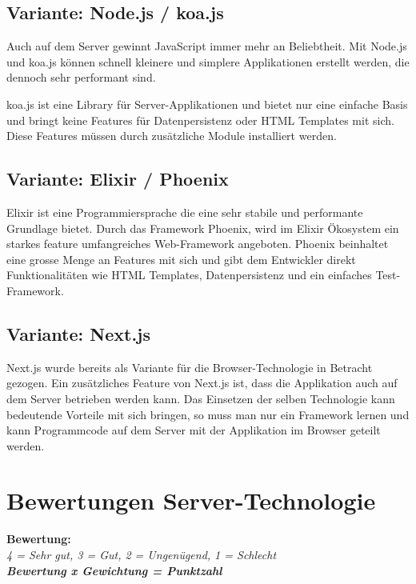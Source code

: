 \subsection{Variante: Node.js / koa.js}

Auch auf dem Server gewinnt JavaScript immer mehr an Beliebtheit.
Mit Node.js und koa.js können schnell kleinere und simplere Applikationen
erstellt werden, die dennoch sehr performant sind.

koa.js ist eine Library für Server-Applikationen und bietet nur eine einfache
Basis und bringt keine Features für Datenpersistenz oder HTML Templates mit sich.
Diese Features müssen durch zusätzliche Module installiert werden.

\subsection{Variante: Elixir / Phoenix}

Elixir ist eine Programmiersprache die eine sehr stabile und performante Grundlage
bietet. Durch das Framework Phoenix, wird im Elixir Ökosystem ein starkes feature
umfangreiches Web-Framework angeboten. Phoenix beinhaltet eine grosse Menge an
Features mit sich und gibt dem Entwickler direkt Funktionalitäten wie HTML
Templates, Datenpersistenz und ein einfaches Test-Framework.

\subsection{Variante: Next.js}

Next.js wurde bereits als Variante für die Browser-Technologie in Betracht
gezogen. Ein zusätzliches Feature von Next.js ist, dass die Applikation auch
auf dem Server betrieben werden kann.
Das Einsetzen der selben Technologie kann bedeutende Vorteile mit sich bringen,
so muss man nur ein Framework lernen und kann Programmcode auf dem Server mit
der Applikation im Browser geteilt werden.

\clearpage
\section{Bewertungen Server-Technologie}\label{bewertungen-server-technologie}

\textbf{Bewertung:}\\
\textit{4 = Sehr gut, 3 = Gut, 2 = Ungenügend, 1 = Schlecht}\\


\textbf{\textit{Bewertung x Gewichtung = Punktzahl}}


